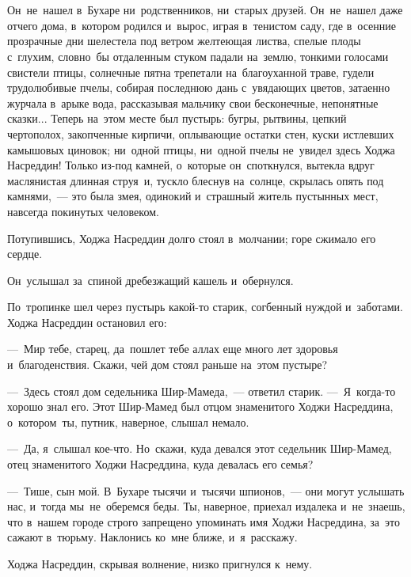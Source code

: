 \documentclass[12pt,a4paper]{book}
\begin{document}
\chapter{}

Он~не~нашел в~Бухаре ни~родственников, ни~старых друзей. Он~не~нашел даже отчего дома, в~котором родился и~вырос, играя в~тенистом саду, где в~осенние прозрачные дни шелестела под ветром желтеющая листва, спелые плоды с~глухим, словно~бы отдаленным стуком падали на~землю, тонкими голосами свистели птицы, солнечные пятна трепетали на~благоуханной траве, гудели трудолюбивые пчелы, собирая последнюю дань с~увядающих цветов, затаенно журчала в~арыке вода, рассказывая мальчику свои бесконечные, непонятные сказки... Теперь на~этом месте был пустырь: бугры, рытвины, цепкий чертополох, закопченные кирпичи, оплывающие остатки стен, куски истлевших камышовых циновок; ни~одной птицы, ни~одной пчелы не~увидел здесь Ходжа Насреддин! Только из-под камней, о~которые он~споткнулся, вытекла вдруг маслянистая длинная струя~и, тускло блеснув на~солнце, скрылась опять под камнями,~— это была змея, одинокий и~страшный житель пустынных мест, навсегда покинутых человеком.

Потупившись, Ходжа Насреддин долго стоял в~молчании; горе сжимало его сердце.

Он~услышал за~спиной дребезжащий кашель и~обернулся.

По~тропинке шел через пустырь какой-то старик, согбенный нуждой и~заботами. Ходжа Насреддин остановил его:

—~Мир тебе, старец, да~пошлет тебе аллах еще много лет здоровья и~благоденствия. Скажи, чей дом стоял раньше на~этом пустыре?

—~Здесь стоял дом седельника Шир-Мамеда,~— ответил старик. —~Я~когда-то хорошо знал его. Этот Шир-Мамед был отцом знаменитого Ходжи Насреддина, о~котором~ты, путник, наверное, слышал немало.

—~Да, я~слышал кое-что. Но~скажи, куда девался этот седельник Шир-Мамед, отец знаменитого Ходжи Насреддина, куда девалась его семья?

—~Тише, сын мой. В~Бухаре тысячи и~тысячи шпионов,~— они могут услышать нас, и~тогда мы~не~оберемся беды. Ты, наверное, приехал издалека и~не~знаешь, что в~нашем городе строго запрещено упоминать имя Ходжи Насреддина, за~это сажают в~тюрьму. Наклонись ко~мне ближе, и~я~расскажу.

Ходжа Насреддин, скрывая волнение, низко пригнулся к~нему.
\end{document}
